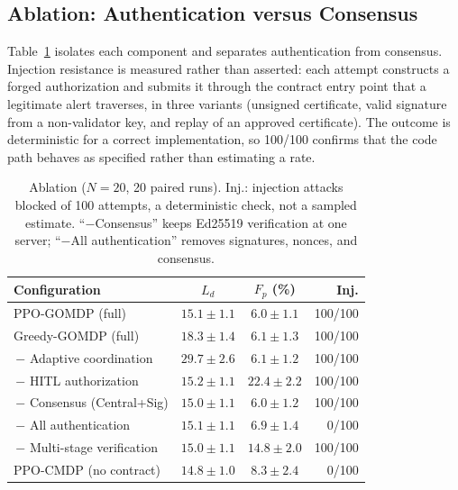 \documentclass[letterpaper]{article} %
\begin{document}
\subsection{Ablation: Authentication versus Consensus}
\label{sec:ablation}

Table~\ref{tab:ablation} isolates each component and separates authentication from consensus. Injection resistance is measured rather than asserted: each attempt constructs a forged authorization and submits it through the contract entry point that a legitimate alert traverses, in three variants (unsigned certificate, valid signature from a non-validator key, and replay of an approved certificate). The outcome is deterministic for a correct implementation, so 100/100 confirms that the code path behaves as specified rather than estimating a rate.

\begin{table}[!t]
\caption{Ablation ($N{=}20$, 20 paired runs). Inj.: injection attacks blocked of 100 attempts, a deterministic check, not a sampled estimate. ``$-$Consensus'' keeps Ed25519 verification at one server; ``$-$All authentication'' removes signatures, nonces, and consensus.}
\label{tab:ablation}
\centering
\setlength{\tabcolsep}{2.5pt}
\footnotesize
\begin{tabular}{@{}lccr@{}}
\toprule
\textbf{Configuration} & $L_d$ & $F_p$ (\%) & \textbf{Inj.} \\
\midrule
PPO-GOMDP (full) & $15.1\!\pm\!1.1$ & $6.0\!\pm\!1.1$ & 100/100 \\
Greedy-GOMDP (full) & $18.3\!\pm\!1.4$ & $6.1\!\pm\!1.3$ & 100/100 \\
\;\,$-$ Adaptive coordination & $29.7\!\pm\!2.6$ & $6.1\!\pm\!1.2$ & 100/100 \\
\;\,$-$ HITL authorization & $15.2\!\pm\!1.1$ & $22.4\!\pm\!2.2$ & 100/100 \\
\;\,$-$ Consensus (Central+Sig) & $15.0\!\pm\!1.1$ & $6.0\!\pm\!1.2$ & 100/100 \\
\;\,$-$ All authentication & $15.1\!\pm\!1.1$ & $6.9\!\pm\!1.4$ & 0/100 \\
\;\,$-$ Multi-stage verification & $15.0\!\pm\!1.1$ & $14.8\!\pm\!2.0$ & 100/100 \\
PPO-CMDP (no contract) & $14.8\!\pm\!1.0$ & $8.3\!\pm\!2.4$ & 0/100 \\
\bottomrule
\end{tabular}
\end{table}
\end{document}
